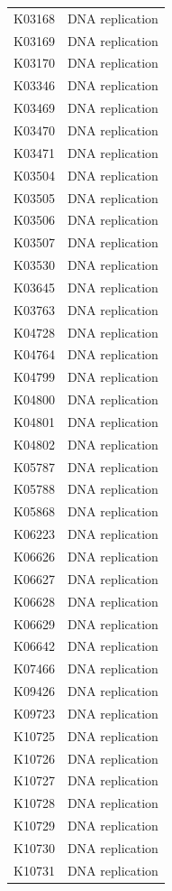 \begin{longtable}{@{}l l@{}}
K03168 & DNA replication \\
K03169 & DNA replication \\
K03170 & DNA replication \\
K03346 & DNA replication \\
K03469 & DNA replication \\
K03470 & DNA replication \\
K03471 & DNA replication \\
K03504 & DNA replication \\
K03505 & DNA replication \\
K03506 & DNA replication \\
K03507 & DNA replication \\
K03530 & DNA replication \\
K03645 & DNA replication \\
K03763 & DNA replication \\
K04728 & DNA replication \\
K04764 & DNA replication \\
K04799 & DNA replication \\
K04800 & DNA replication \\
K04801 & DNA replication \\
K04802 & DNA replication \\
K05787 & DNA replication \\
K05788 & DNA replication \\
K05868 & DNA replication \\
K06223 & DNA replication \\
K06626 & DNA replication \\
K06627 & DNA replication \\
K06628 & DNA replication \\
K06629 & DNA replication \\
K06642 & DNA replication \\
K07466 & DNA replication \\
K09426 & DNA replication \\
K09723 & DNA replication \\
K10725 & DNA replication \\
K10726 & DNA replication \\
K10727 & DNA replication \\
K10728 & DNA replication \\
K10729 & DNA replication \\
K10730 & DNA replication \\
K10731 & DNA replication \\

\end{longtable}

